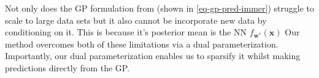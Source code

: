 \documentclass{article}
\newcommand{\mbf}[1]{\mathbf{#1}}
\renewcommand{\mid}{\,|\,}
\newcommand{\MS}{\mbf{S}}
\newcommand{\vm}{\mbf{m}}
\newcommand{\vu}{\mbf{u}}
\newcommand{\vx}{\mbf{x}}
\newcommand{\vw}{\mbf{w}}
\begin{document}
Not only does the GP formulation from \citet{immer2021improving} (shown in \cref{eq-gp-pred-immer}) struggle to scale to large data sets but
it also cannot be incorporate new data by conditioning on it.
This is because it's posterior mean is the NN  $f_{\vw^*}(\vx)$
Our method overcomes both of these limitations via a dual parameterization.
Importantly, our dual parameterization enables us to sparsify it whilst making predictions directly from the GP.




\end{document}
